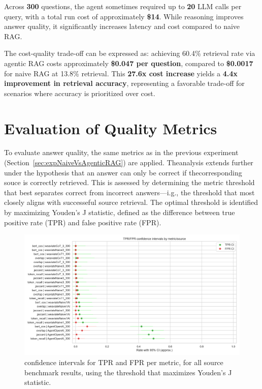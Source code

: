 Across \textbf{300} questions, the agent sometimes required up to \textbf{20} \gls{LLM} calls per query, with a total run cost of approximately \textbf{\$14}. While reasoning improves answer quality, it significantly increases latency and cost compared to naive \gls{RAG}.

The cost-quality trade-off can be expressed as: achieving 60.4\% retrieval rate via agentic \gls{RAG} costs approximately \textbf{\$0.047 per question}, compared to \textbf{\$0.0017} for naive \gls{RAG} at 13.8\% retrieval. This \textbf{27.6x cost increase} yields a \textbf{4.4x improvement in retrieval accuracy}, representing a favorable trade-off for scenarios where accuracy is prioritized over cost.

\section{Evaluation of Quality Metrics}
\label{sec:metric-evaluation-quality}
To evaluate answer quality, the same metrics as in the previous experiment (Section~\ref{sec:expNaiveVsAgenticRAG}) are applied. Theanalysis extends further under the hypothesis that an answer can only be correct if thecorresponding souce is correctly retrieved. This is assessed by determining the metric threshold that best separates correct from incorrect answers—i.g., the threshold that most closely aligns with successeful source retrieval. The optimal threshold is identified by maximizing Youden's J statistic, defined as the difference between true positive rate (TPR) and false positive rate (FPR).
\begin{figure}[H]
    \centering
    \includegraphics[width=1\linewidth]{Figures/06_tpr_fpr_confidence_intervals.png}
    \caption{confidence intervals for TPR and FPR per metric, for all source benchmark results, using the threshold that maximizes Youden's J statistic.}\label{fig:confidence-intervals}
\end{figure}


